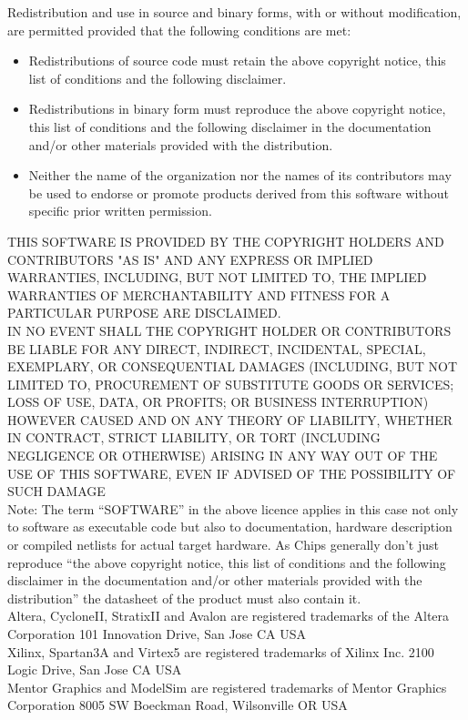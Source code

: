 \documentclass{ruschidoc}
\begin{document}
Redistribution and use in source and binary forms, with or without modification, are
permitted provided that the following conditions are met:
\begin{itemize}
\item Redistributions of source code must retain the above copyright notice, this
  list of conditions and the following disclaimer.
\item Redistributions in binary form must reproduce the above copyright notice, this
  list of conditions and the following disclaimer in the documentation and/or other
  materials provided with the distribution.
\item Neither the name of the organization nor the names of its contributors may be
  used to endorse or promote products derived from this software without specific
  prior written permission.
\end{itemize}
 THIS SOFTWARE IS PROVIDED BY THE COPYRIGHT HOLDERS AND CONTRIBUTORS "AS IS"
 AND ANY EXPRESS OR IMPLIED WARRANTIES, INCLUDING, BUT NOT LIMITED TO, THE
 IMPLIED WARRANTIES OF MERCHANTABILITY AND FITNESS FOR A PARTICULAR PURPOSE
 ARE DISCLAIMED. \\
IN NO EVENT SHALL THE COPYRIGHT HOLDER OR CONTRIBUTORS BE
 LIABLE FOR ANY DIRECT, INDIRECT, INCIDENTAL, SPECIAL, EXEMPLARY,
 OR CONSEQUENTIAL DAMAGES (INCLUDING, BUT NOT LIMITED TO, PROCUREMENT OF
 SUBSTITUTE GOODS OR SERVICES; LOSS OF USE, DATA, OR PROFITS; OR BUSINESS
 INTERRUPTION) HOWEVER CAUSED AND ON ANY THEORY OF LIABILITY, WHETHER IN
 CONTRACT, STRICT LIABILITY, OR TORT (INCLUDING NEGLIGENCE OR OTHERWISE)
 ARISING IN ANY WAY OUT OF THE USE OF THIS SOFTWARE, EVEN IF ADVISED OF
 THE POSSIBILITY OF SUCH DAMAGE\\

 Note: The term ``SOFTWARE'' in the above licence applies in this case not only to
 software as executable code but also to documentation, hardware description or
 compiled netlists for actual target hardware. As Chips generally don't just
 reproduce ``the above copyright notice, this list of conditions and the following
 disclaimer in the documentation and/or other materials provided with the
 distribution'' the datasheet of the product must also contain it.\\

 Altera, CycloneII, StratixII and Avalon are registered trademarks of the Altera
 Corporation
 101 Innovation Drive, San Jose CA USA \\
 Xilinx, Spartan3A and Virtex5 are registered trademarks of Xilinx Inc. 2100 Logic Drive, San Jose CA USA \\
 Mentor Graphics and ModelSim are registered trademarks of Mentor Graphics
 Corporation 8005 SW Boeckman Road, Wilsonville OR USA \newpage

\printacronym
\printglossary


\revisionTable
\end{document}
